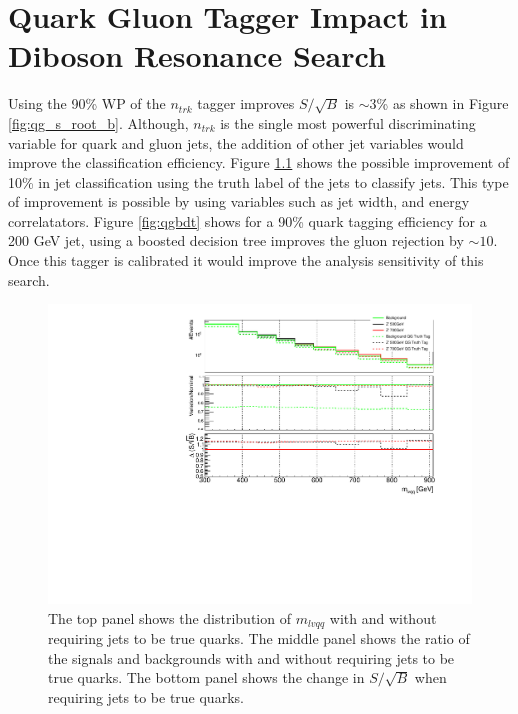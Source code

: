 {\chapter{Quark Gluon Tagger Impact in Diboson Resonance Search}
Using the 90\% WP of the $n_{trk}$ tagger improves $S/\sqrt{B}$ is $\sim 3$\% as shown in Figure \ref{fig:qg_s_root_b}. Although, $n_{trk}$ is the single most powerful discriminating variable for quark and gluon jets, the addition of other jet variables would improve the classification efficiency. Figure \ref{fig:quark_gluon_roc_truth} shows the possible improvement of 10\%  in jet classification using the truth label of the jets to classify jets.  This type of improvement is possible by using variables such as jet width, and energy correlatators. Figure \ref{fig:qgbdt} shows for a 90\% quark tagging efficiency for a 200 GeV jet, using a boosted decision tree improves the gluon rejection by $\sim 10$. Once this tagger is calibrated it would improve the analysis sensitivity of this search.

\begin{figure}[h!]
  \centering
  \includegraphics[width=\hsize]{figures/QGT/s_root_b_truthtag.pdf}
  \caption{The top panel shows the distribution of $m_{lvqq}$ with and without requiring jets to be true quarks. The middle panel shows the ratio of the signals and backgrounds with and without requiring jets to be true quarks. The bottom panel shows the change in $S/\sqrt{B}$ when requiring jets to be true quarks.}
  \label{fig:quark_gluon_roc_truth}
\end{figure}
\FloatBarrier

}
